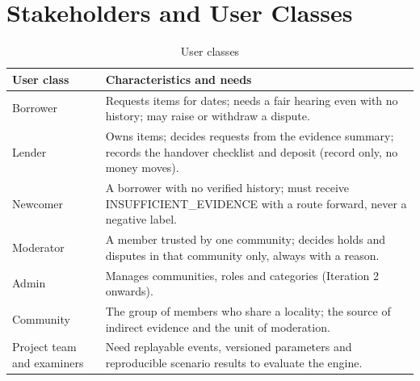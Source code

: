 \section{Stakeholders and User Classes}\label{sec:stakeholders-user-classes}
\begin{table}[H]
\centering
\caption{User classes}\label{tab:user-classes}
\begin{tabular}{@{}L{81pt}L{298pt}@{}}
\toprule
User class & Characteristics and needs \\
\midrule
Borrower & Requests items for dates; needs a fair hearing even with no history; may raise or withdraw a dispute. \\
Lender & Owns items; decides requests from the evidence summary; records the handover checklist and deposit (record only, no money moves). \\
Newcomer & A borrower with no verified history; must receive INSUFFICIENT\_EVIDENCE with a route forward, never a negative label. \\
Moderator & A member trusted by one community; decides holds and disputes in that community only, always with a reason. \\
Admin & Manages communities, roles and categories (Iteration 2 onwards). \\
Community & The group of members who share a locality; the source of indirect evidence and the unit of moderation. \\
Project team and examiners & Need replayable events, versioned parameters and reproducible scenario results to evaluate the engine. \\
\bottomrule
\end{tabular}
\end{table}
